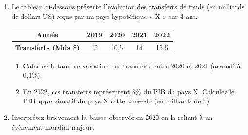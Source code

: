 \documentclass[11pt]{article}
\begin{document}
\begin{exercice}
\begin{enumerate}
    \item Le tableau ci-dessous présente l'évolution des transferts de fonds (en milliards de dollars US) reçus par un pays hypotétique « X » sur 4 ans.
    
    \begin{tabular}{|c|c|c|c|c|}
    \hline
    \textbf{Année} & 2019 & 2020 & 2021 & 2022 \\
    \hline
    \textbf{Transferts (Mds \$)} & 12 & 10,5 & 14 & 15,5 \\
    \hline
    \end{tabular}
    
    \begin{enumerate}
        \item Calculez le taux de variation des transferts entre 2020 et 2021 (arrondi à 0,1\%).
        \item En 2022, ces transferts représentent 8\% du PIB du pays X. Calculez le PIB approximatif du pays X cette année-là (en milliards de \$).
    \end{enumerate}
    
    \item Interprétez brièvement la baisse observée en 2020 en la reliant à un événement mondial majeur.
\end{enumerate}
\end{exercice}
\end{document}
